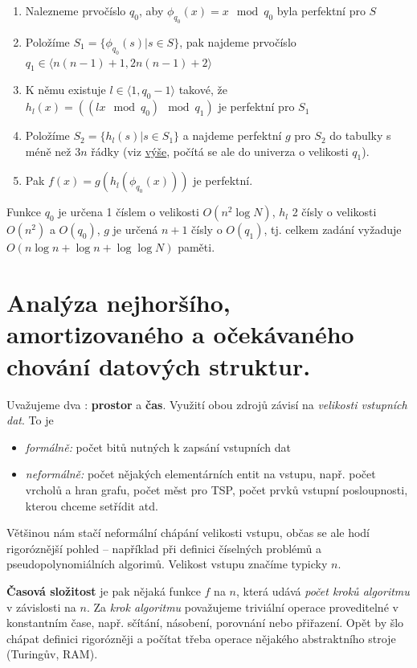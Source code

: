 \documentclass[11pt]{report} %
\numberwithin{equation}{section}
\begin{document}
\begin{enumerate}
	
	\item
	Nalezneme prvočíslo $q_0$, aby $\phi_{q_0}(x)=x\mod q_0$
	byla perfektní pro $S$
	\item
	Položíme $S_1=\{\phi_{q_0}(s)|s\in S\}$, pak najdeme prvočíslo
	$q_1\in \langle n(n-1)+1,2n(n-1)+2\rangle$
	\item
	K němu existuje $l\in \langle1,q_0-1\rangle$ takové, že
	$h_l(x)=((lx\mod q_0)\mod q_1)$ je perfektní pro $S_1$
	\item
	Položíme $S_2=\{h_l(s)|s\in S_1\}$ a najdeme perfektní $g$
	pro $S_2$ do tabulky s méně než $3n$ řádky (viz
	\protect\hyperlink{Menux161uxed_tabulka}{výše}, počítá se ale do
	univerza o velikosti $q_1$).
	\item
	Pak $f(x)=g(h_l(\phi_{q_0}(x)))$ je perfektní.
\end{enumerate}

Funkce $q_0$ je určena 1 číslem o velikosti $O(n^2\log N)$,
$h_l$ 2 čísly o velikosti $O(n^2)$ a $O(q_0)$,
$g$ je určená $n+1$ čísly o $O(q_1)$, tj. celkem
zadání vyžaduje $O(n\log n+\log n+\log\log N)$ paměti.



\section{Analýza nejhoršího, amortizovaného a očekávaného chování datových struktur.}
Uvažujeme dva : \textbf{prostor} a \textbf{čas}. Využití obou zdrojů závisí na \textit{velikosti vstupních dat}. To je
\begin{itemize}
	\item \textit{formálně:} počet bitů nutných k zapsání vstupních dat
	\item \textit{neformálně:} počet nějakých elementárních entit na vstupu, např. počet vrcholů a hran grafu, počet měst pro TSP, počet prvků vstupní posloupnosti, kterou chceme setřídit atd.
\end{itemize} 
Většinou nám stačí neformální chápání velikosti vstupu, občas se ale hodí rigoróznější pohled -- například při definici číselných problémů a pseudopolynomiálních algorimů. Velikost vstupu značíme typicky $n$.

\textbf{Časová složitost} je pak nějaká funkce $f$ na $n$, která udává \textit{počet kroků algoritmu} v závislosti na $n$. Za \textit{krok algoritmu} považujeme triviální operace proveditelné v konstantním čase, např. sčítání, násobení, porovnání nebo přiřazení. Opět by šlo chápat definici rigorózněji a počítat třeba operace nějakého abstraktního stroje (Turingův, RAM).
\end{document}
